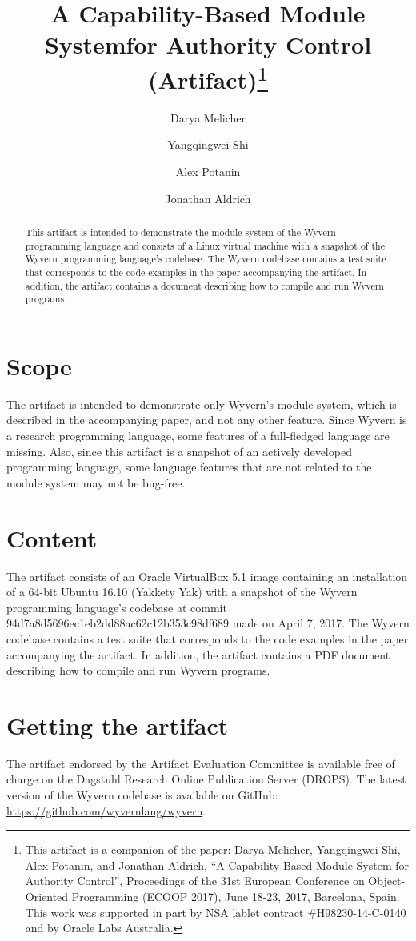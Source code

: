 \documentclass[a4paper,UKenglish]{darts}
\title{A Capability-Based Module System\newline for Authority Control (Artifact)\footnote{This artifact is a companion of the paper:  Darya Melicher, Yangqingwei Shi, Alex Potanin, and Jonathan Aldrich, ``A Capability-Based Module System for Authority Control'', Proceedings of the 31st European Conference on Object-Oriented Programming (ECOOP 2017), June 18-23, 2017, Barcelona, Spain. This work was supported in part by NSA lablet contract \#H98230-14-C-0140 and by Oracle Labs Australia.}}
\author[1]{Darya Melicher}
\author[2]{Yangqingwei Shi}
\author[3]{Alex Potanin}
\author[4]{Jonathan Aldrich}
\affil[1]{Carnegie Mellon University, Pittsburgh, PA, USA}
\affil[2]{Carnegie Mellon University, Pittsburgh, PA, USA}
\affil[3]{Victoria University of Wellington, Wellington, New Zealand}
\affil[4]{Carnegie Mellon University, Pittsburgh, PA, USA}
\newenvironment{scope}{\section{Scope}}{}
\newenvironment{content}{\section{Content}}{}
\newenvironment{getting}{\section{Getting the artifact} The artifact 
endorsed by the Artifact Evaluation Committee is available free of 
charge on the Dagstuhl Research Online Publication Server (DROPS).}{}
\begin{document}
\maketitle

\begin{abstract}
This artifact is intended to demonstrate the module system of the Wyvern programming language and consists of a Linux virtual machine with a snapshot of the Wyvern programming language's codebase. The Wyvern codebase contains a test suite that corresponds to the code examples in the paper accompanying the artifact. In addition, the artifact contains a document describing how to compile and run Wyvern programs.
 \end{abstract}


\begin{scope}
The artifact is intended to demonstrate only Wyvern's module system, which is described in the accompanying paper, and not any other feature. Since Wyvern is a research programming language, some features of a full-fledged language are missing. Also, since this artifact is a snapshot of an actively developed programming language, some language features that are not related to the module system may not be bug-free.
\end{scope}

\begin{content}
The artifact consists of an Oracle VirtualBox 5.1 image containing an installation of a 64-bit Ubuntu 16.10 (Yakkety Yak) with a snapshot of the Wyvern programming language's codebase at commit 94d7a8d5696ec1eb2dd88ac62c12b353c98df689 made on April 7, 2017. The Wyvern codebase contains a test suite that corresponds to the code examples in the paper accompanying the artifact. In addition, the artifact contains a PDF document describing how to compile and run Wyvern programs.
\end{content} 

\begin{getting}
  The latest version of the Wyvern codebase is available on GitHub: \url{https://github.com/wyvernlang/wyvern}.
\end{getting} 
\end{document}
